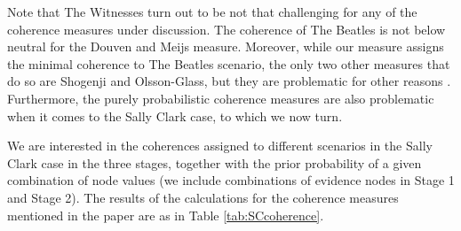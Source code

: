 \documentclass[10pt,]{scrartcl}
\begin{document}
\begin{table}
        \caption{Coherence scores for the Beatles and witness scenarios.}
    \label{tab:witnesses}
\end{table}


Note that  \textsf{The Witnesses} turn out to be not that
challenging for any of the coherence measures under discussion.
 The coherence of \textsf{The Beatles} is not below neutral for  the  Douven and Meijs measure. Moreover, while our measure assigns the minimal coherence to \textsf{The Beatles} scenario, the only two other measures that do so are Shogenji and Olsson-Glass, but they are problematic for other reasons  \citep{Merricks1995, Akiba2000Shogenjis, Shogenji2001Reply, Siebel2004On-Fitelsons-me,siebel2006against,Shogenji2006Why,koscholke2016evaluating, Schippers2019General}.  Furthermore, the purely probabilistic coherence  measures  are also problematic when it comes to the Sally Clark case, to which we now turn.





We are interested in the coherences assigned to different scenarios in the Sally Clark case  in the three stages, together with the prior probability of a given combination of node values (we include combinations of evidence nodes in Stage 1 and Stage 2). The results of the calculations for the coherence measures mentioned in the paper are as in Table \ref{tab:SCcoherence}.
\end{document}
